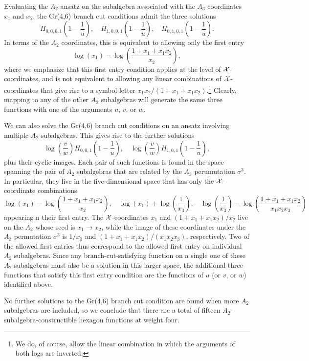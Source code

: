 \documentclass[12pt]{article}
\begin{document}
Evaluating the $A_2$ ansatz on the subalgebra associated with the $A_3$ coordinates $x_1$ and $x_2$, the Gr(4,6) branch cut conditions admit the three solutions 
$$H_{0,0,0,1}\left(1-\frac1u \right), \quad H_{1,0,0,1}\left(1-\frac1u \right), \quad H_{0,1,0,1}\left(1-\frac1u \right).$$
In terms of the $A_2$ coordinates, this is equivalent to allowing only the first entry
$$\log (x_1)- \log \left ( \frac{1 + x_1 + x_1 x_2}{x_2} \right),$$
where we emphasize that this first entry condition applies at the level of ${\cal X}$-coordinates, and is not equivalent to allowing any linear combinations of ${\cal X}$-coordinates that give rise to a symbol letter $x_1 x_2/(1+x_1 + x_1 x_2)$.\footnote{We do, of course, allow the linear combination in which the arguments of both logs are inverted.} Clearly, mapping to any of the other $A_2$ subalgebras will generate the same three functions with one of the arguments $u$, $v$, or $w$.

We can also solve the Gr(4,6) branch cut conditions on an ansatz involving multiple $A_2$ subalgebras. This gives rise to the further solutions
$$\log \left( \frac v w \right) H_{0, 0, 1} \left(1-\frac1u \right), \quad  \log \left( \frac v w \right) H_{1, 0, 1} \left(1-\frac1u \right),$$
plus their cyclic images. Each pair of such functions is found in the space spanning the pair of $A_2$ subalgebras that are related by the $A_3$ perumutation $\sigma^3$. In particular, they live in the five-dimensional space that has only the ${\cal X}$-coordinate combinations 
$$\log(x_1) -\log \left( \frac{1 + x_1 + x_1 x_2}{x_2} \right), \quad \log(x_1) + \log \left( \frac{1}{x_3} \right), \quad \log \left( \frac{1}{x_3} \right) - \log \left( \frac{1 + x_1 + x_1 x_2}{x_1 x_2 x_3} \right) $$
appearing n their first entry. The ${\cal X}$-coordinates $x_1$ and $(1 + x_1 + x_1 x_2)/x_2$ live on the $A_2$ whose seed is $x_1 \rightarrow x_2$, while the image of these coordinates under the $A_3$ permutation $\sigma^3$ is $1/x_3$ and $(1 + x_1 + x_1 x_2)/(x_1 x_2 x_3)$, respectively. Two of the allowed first entries thus correspond to the allowed first entry on individual $A_2$ subalgebras. Since any branch-cut-satisfying function on a single one of these $A_2$ subalgebras must also be a solution in this larger space, the additional three functions that satisfy this first entry condition are the functions of $u$ (or $v$, or $w$) identified above. 

No further solutions to the Gr(4,6) branch cut condition are found when more $A_2$ subalgebras are included, so we conclude that there are a total of fifteen $A_2$-subalgebra-constructible hexagon functions at weight four.
\end{document}
